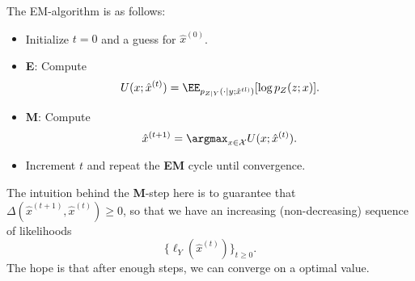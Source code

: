 The EM-algorithm is as follows: 
\begin{itemize}
	\item Initialize $t=0$ and a guess for $\hat{x}^{(0)}$. 
	\item \textbf{E}: Compute 
		\[U(x;\hat{x}^{(t)}) = \EE_{p_{Z|Y}(\cdot | y; \hat{x}^{tl)})}[\log p_Z(z;x)].\] 
	\item \textbf{M}: Compute 
		\[\hat{x}^{(t+1)} = \argmax_{x\in \mathcal{X}}U(x; \hat{x}^{(t)}).\]
	\item Increment $t$ and repeat the \textbf{EM} cycle until convergence. 
\end{itemize}
The intuition behind the \textbf{M}-step here is to guarantee that $\Delta(\hat{x}^{(t+1)}, \hat{x}^{(t)}) \geq 0$, so that we have an increasing (non-decreasing) sequence of likelihoods 
\[\{\ell_Y(\hat{x}^{(t)})\}_{t\geq 0}.\] 
The hope is that after enough steps, we can converge on a optimal value. 
